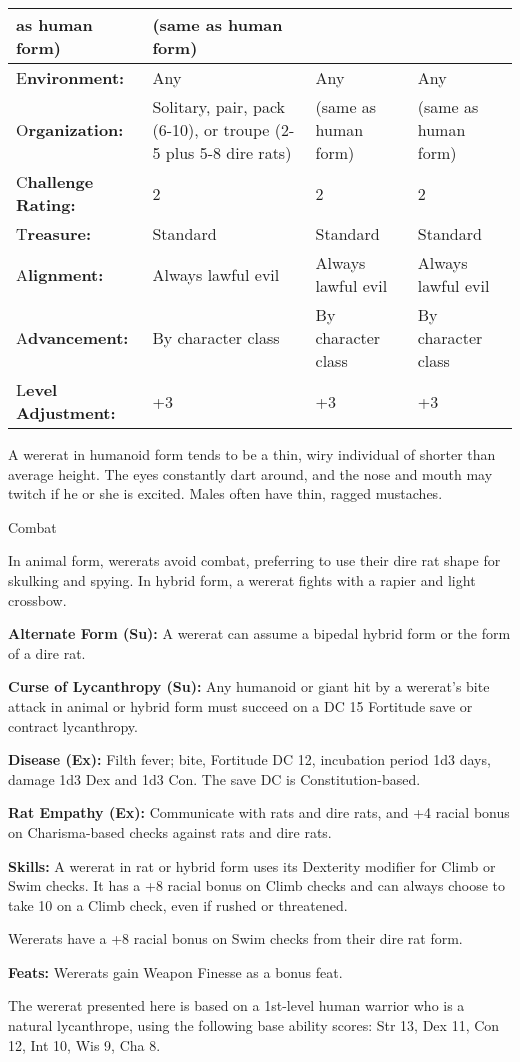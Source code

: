 \documentclass{article}
\begin{document}
\begin{tabular}{|>{\raggedright}p{67pt}|>{\raggedright}p{78pt}|>{\raggedright}p{78pt}|>{\raggedright}p{78pt}|}
as human form) & (same as human form)\tabularnewline
\hline
E\textbf{nvironment:} & Any & Any & Any\tabularnewline
\hline
O\textbf{rganization:} & Solitary, pair, pack (6-10), or troupe (2-5 plus 5-8 dire 
rats) & (same as human form) & (same as human form)\tabularnewline
\hline
C\textbf{hallenge Rating:} & 2 & 2 & 2\tabularnewline
\hline
T\textbf{reasure:} & Standard & Standard & Standard\tabularnewline
\hline
A\textbf{lignment:} & Always lawful evil & Always lawful evil & Always lawful evil\tabularnewline
\hline
A\textbf{dvancement:} & By character class & By character class & By character 
class\tabularnewline
\hline
L\textbf{evel Adjustment:} & +3 & +3 & +3\tabularnewline
\hline
\end{tabular}

A wererat in humanoid form tends to be a thin, wiry individual of shorter than 
average height. The eyes constantly dart around, and the nose and mouth may twitch 
if he or she is excited. Males often have thin, ragged mustaches.

Combat

In animal form, wererats avoid combat, preferring to use their dire rat shape for 
skulking and spying. In hybrid form, a wererat fights with a rapier and light crossbow.

\textbf{Alternate Form (Su):} A wererat can assume a bipedal hybrid form or the 
form of a dire rat.

\textbf{Curse of Lycanthropy (Su):} Any humanoid or giant hit by a wererat's bite 
attack in animal or hybrid form must succeed on a DC 15 Fortitude save or contract 
lycanthropy.

\textbf{Disease (Ex):} Filth fever; bite, Fortitude DC 12, incubation period 1d3 
days, damage 1d3 Dex and 1d3 Con. The save DC is Constitution-based.

\textbf{Rat Empathy (Ex): }Communicate with rats and dire rats, and +4 racial bonus 
on Charisma-based checks against rats and dire rats.

\textbf{Skills:} A wererat in rat or hybrid form uses its Dexterity modifier for 
Climb or Swim checks. It has a +8 racial bonus on Climb checks and can always choose 
to take 10 on a Climb check, even if rushed or threatened.

Wererats have a +8 racial bonus on Swim checks from their dire rat form.

\textbf{Feats:} Wererats gain Weapon Finesse as a bonus feat. 

The wererat presented here is based on a 1st-level human warrior who is a natural 
lycanthrope, using the following base ability scores: Str 13, Dex 11, Con 12, Int 
10, Wis 9, Cha 8.
\end{document}

